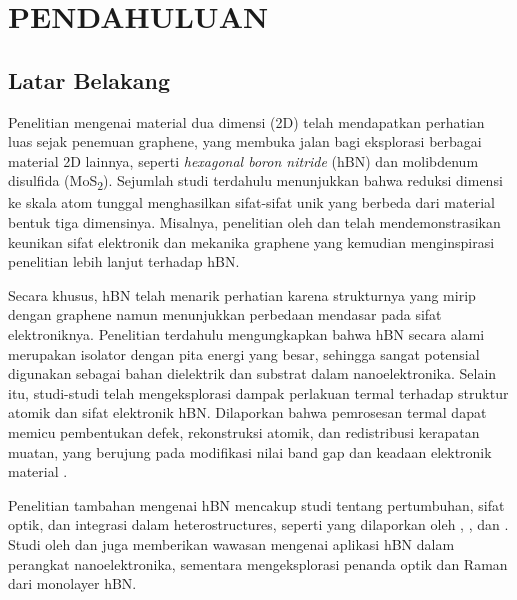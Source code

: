 \renewcommand{\thechapter}{\Roman{chapter}}
\chapter{PENDAHULUAN}
\renewcommand{\thechapter}{\arabic{chapter}}
\pagestyle{konten}


\section{Latar Belakang}
Penelitian mengenai material dua dimensi (2D) telah mendapatkan perhatian luas sejak penemuan graphene, yang membuka jalan bagi eksplorasi berbagai material 2D lainnya, seperti \textit{hexagonal boron nitride} (hBN) dan molibdenum disulfida (MoS\textsubscript{2}). Sejumlah studi terdahulu menunjukkan bahwa reduksi dimensi ke skala atom tunggal menghasilkan sifat-sifat unik yang berbeda dari material bentuk tiga dimensinya. Misalnya, penelitian oleh \citep{novoselov_electric_2004} dan \citep{geim_rise_2007} telah mendemonstrasikan keunikan sifat elektronik dan mekanika graphene yang kemudian menginspirasi penelitian lebih lanjut terhadap hBN.

Secara khusus, hBN telah menarik perhatian karena strukturnya yang mirip dengan graphene namun menunjukkan perbedaan mendasar pada sifat elektroniknya. Penelitian terdahulu mengungkapkan bahwa hBN secara alami merupakan isolator dengan pita energi yang besar, sehingga sangat potensial digunakan sebagai bahan dielektrik dan substrat dalam nanoelektronika. Selain itu, studi-studi telah mengeksplorasi dampak perlakuan termal terhadap struktur atomik dan sifat elektronik hBN. Dilaporkan bahwa pemrosesan termal dapat memicu pembentukan defek, rekonstruksi atomik, dan redistribusi kerapatan muatan, yang berujung pada modifikasi nilai band gap dan keadaan elektronik material \citep{prethesis1,prethesis2}.

Penelitian tambahan mengenai hBN mencakup studi tentang pertumbuhan, sifat optik, dan integrasi dalam heterostructures, seperti yang dilaporkan oleh \citep{watanabe2004direct}, \citep{rubio1994theory}, dan \citep{dean2010boron}. Studi oleh \citep{tran2016robust} dan \citep{kim2012synthesis} juga memberikan wawasan mengenai aplikasi hBN dalam perangkat nanoelektronika, sementara \citep{gorbachev2011hunting} mengeksplorasi penanda optik dan Raman dari monolayer hBN.

